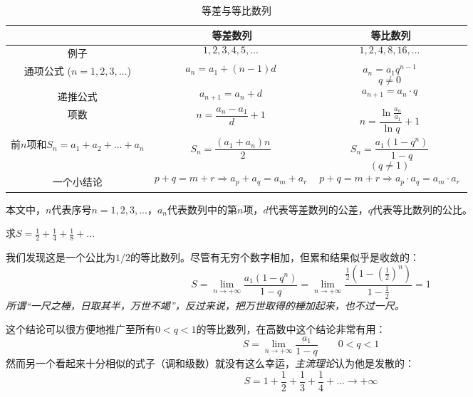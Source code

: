 

\begin{table}[ht]
\centering
\caption{等差与等比数列}\label{tab_AGS1}
\begin{tabular}{|c|c|c|}
\hline
 & 等差数列 & 等比数列 \\
\hline
例子 & $$1,2,3,4,5,...~$$ & $$1,2,4,8,16,...~$$ \\
\hline
通项公式 ($n=1,2,3,...$) & $$a_n = a_1 + (n-1)d~$$ & $$a_n = a_1 q^{n-1}~$$ $$q\ne0~$$ \\
\hline
递推公式 & $$a_{n+1} = a_n + d~$$ & $$a_{n+1} = a_n \cdot q~$$ \\
\hline
项数& $$n = \frac{a_n-a_1}{d} + 1~$$ & $$n = \frac{\ln{\frac{a_n}{a_1}}}{\ln{q}} + 1~$$ \\
\hline
前$n$项和$S_n=a_1+a_2+...+a_n$& $$S_n=\frac{(a_1+a_n)n}{2}~$$ & $$S_n = \frac{a_1 (1-q^n)}{1-q}~$$ $$(q\ne 1)~$$ \\
\hline
一个小结论 & $$p+q=m+r \Rightarrow a_p+a_q = a_m + a_r~$$ & $$p+q=m+r \Rightarrow a_p \cdot a_q = a_m \cdot a_r~$$ \\
\hline
\end{tabular}
\end{table}

本文中，$n$代表序号$n=1,2,3,...$，$a_n$代表数列中的第$n$项，$d$代表等差数列的公差，$q$代表等比数列的公比。

\begin{example}{}
求$S = \frac{1}{2}+\frac{1}{4}+\frac{1}{8}+...$

我们发现这是一个公比为$1/2$的等比数列。尽管有无穷个数字相加，但累和结果似乎是收敛的：
$$S = \lim_{n \to +\infty} \frac{a_1 (1-q^n)}{1-q}
= \lim_{n \to +\infty} \frac{\frac{1}{2} (1-(\frac{1}{2})^n)}{1-\frac{1}{2}}
=1 ~$$
\textsl{所谓“一尺之棰，日取其半，万世不竭”，反过来说，把万世取得的棰加起来，也不过一尺。}

这个结论可以很方便地推广至所有$0<q<1$的等比数列，在高数中这个结论非常有用：
$$S = \lim_{n \to +\infty} \frac{a_1}{1-q} \qquad 0<q<1~$$
然而另一个看起来十分相似的式子（调和级数）就没有这么幸运，\textsl{主流理论}认为他是发散的：
$$S = 1+\frac{1}{2}+\frac{1}{3}+\frac{1}{4}+...\to+\infty~$$
\end{example}
